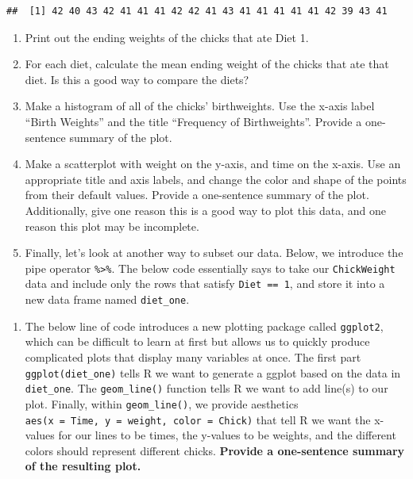 \documentclass[]{article}
\newenvironment{Shaded}{\begin{snugshade}}{\end{snugshade}}
\newcommand{\DecValTok}[1]{\textcolor[rgb]{0.00,0.00,0.81}{#1}}
\newcommand{\KeywordTok}[1]{\textcolor[rgb]{0.13,0.29,0.53}{\textbf{#1}}}
\newcommand{\NormalTok}[1]{#1}
\newcommand{\OperatorTok}[1]{\textcolor[rgb]{0.81,0.36,0.00}{\textbf{#1}}}
\newcommand{\StringTok}[1]{\textcolor[rgb]{0.31,0.60,0.02}{#1}}
\providecommand{\tightlist}{%
  \setlength{\itemsep}{0pt}\setlength{\parskip}{0pt}}
\begin{document}
\begin{verbatim}
##  [1] 42 40 43 42 41 41 41 42 42 41 43 41 41 41 41 41 42 39 43 41
\end{verbatim}

\begin{enumerate}
\def\labelenumi{\arabic{enumi}.}
\setcounter{enumi}{4}
\item
  Print out the ending weights of the chicks that ate Diet 1.
\item
  For each diet, calculate the mean ending weight of the chicks that ate
  that diet. Is this a good way to compare the diets?
\item
  Make a histogram of all of the chicks' birthweights. Use the x-axis
  label ``Birth Weights'' and the title ``Frequency of Birthweights''.
  Provide a one-sentence summary of the plot.
\item
  Make a scatterplot with weight on the y-axis, and time on the x-axis.
  Use an appropriate title and axis labels, and change the color and
  shape of the points from their default values. Provide a one-sentence
  summary of the plot. Additionally, give one reason this is a good way
  to plot this data, and one reason this plot may be incomplete.
\item
  Finally, let's look at another way to subset our data. Below, we
  introduce the pipe operator \texttt{\%\textgreater{}\%}. The below
  code essentially says to take our \texttt{ChickWeight} data and
  include only the rows that satisfy \texttt{Diet\ ==\ 1}, and store it
  into a new data frame named \texttt{diet\_one}.
\end{enumerate}

\begin{Shaded}
\end{Shaded}

\begin{enumerate}
\def\labelenumi{\arabic{enumi}.}
\setcounter{enumi}{9}
\tightlist
\item
  The below line of code introduces a new plotting package called
  \texttt{ggplot2}, which can be difficult to learn at first but allows
  us to quickly produce complicated plots that display many variables at
  once. The first part \texttt{ggplot(diet\_one)} tells R we want to
  generate a ggplot based on the data in \texttt{diet\_one}. The
  \texttt{geom\_line()} function tells R we want to add line(s) to our
  plot. Finally, within \texttt{geom\_line()}, we provide aesthetics
  \texttt{aes(x\ =\ Time,\ y\ =\ weight,\ color\ =\ Chick)} that tell R
  we want the x-values for our lines to be times, the y-values to be
  weights, and the different colors should represent different chicks.
  \textbf{Provide a one-sentence summary of the resulting plot.}
\end{enumerate}
\end{document}
